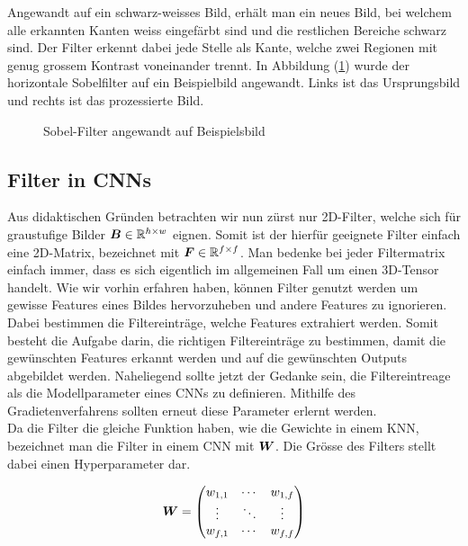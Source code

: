 Angewandt auf ein schwarz-weisses Bild, erhält man ein neues Bild, bei welchem alle erkannten
Kanten weiss eingefärbt sind und die restlichen Bereiche schwarz sind.
Der Filter erkennt dabei jede Stelle als Kante, welche zwei Regionen mit
genug grossem Kontrast voneinander trennt.
In Abbildung (\ref{fig:sobel_filter}) wurde der horizontale Sobelfilter auf ein
Beispielbild angewandt. Links ist das Ursprungsbild und rechts ist das
prozessierte Bild.


\begin{figure}[h!]

  \caption{Sobel-Filter angewandt auf Beispielsbild}
  \label{fig:sobel_filter}
\end{figure}

\para{}
\cite{wiki:sobel_operator}
\cite{deeplearning.ai:cnn}
\cite{wiki:kernel}


\subsection{Filter in CNNs}
Aus didaktischen Gründen betrachten wir nun zürst
nur 2D-Filter, welche sich für graustufige Bilder
$\bm{B} \in \mathbb{R}^{h \times w}$ eignen. Somit ist der hierfür geeignete
Filter einfach eine 2D-Matrix, bezeichnet mit $\bm{F} \in \mathbb{R}^{f \times
  f}$. Man bedenke bei jeder Filtermatrix einfach immer, dass es sich
eigentlich im allgemeinen Fall um einen 3D-Tensor handelt.
\para{}
Wie wir vorhin erfahren haben, können Filter genutzt werden um gewisse
Features eines Bildes hervorzuheben und andere Features zu ignorieren. Dabei
bestimmen die Filtereinträge, welche Features extrahiert werden. Somit besteht
die Aufgabe darin, die richtigen Filtereinträge zu bestimmen, damit die
gewünschten Features erkannt werden und auf die gewünschten Outputs abgebildet
werden. Naheliegend sollte jetzt der Gedanke sein, die Filtereintreage als die
Modellparameter eines CNNs zu definieren.
Mithilfe des Gradietenverfahrens sollten erneut diese Parameter
erlernt werden. \\
Da die Filter die gleiche Funktion haben, wie die Gewichte in einem KNN,
bezeichnet man die Filter in einem CNN mit $\bm{W}$. Die Grösse des Filters
stellt dabei einen Hyperparameter dar.

\begin{equation*}
  \bm{W} = \begin{pmatrix}
    w_{1,1} & \cdots & w_{1,f} \\
    \vdots & \ddots & \vdots \\
    w_{f,1} & \cdots & w_{f,f}
  \end{pmatrix}
\end{equation*}


